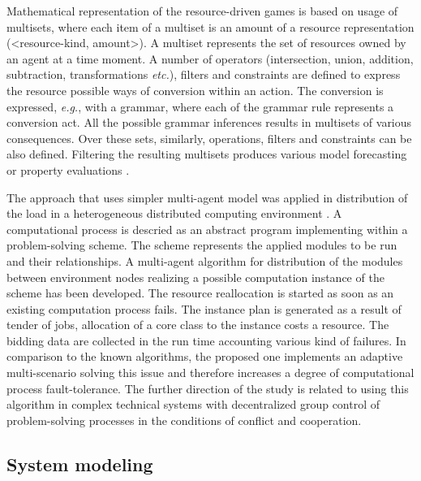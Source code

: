 \documentclass[conference]{IEEEtran}
\begin{document}
Mathematical representation of the resource-driven games is based on usage of multisets, where each item of a multiset is an amount of a resource representation (<resource-kind, amount>). A multiset represents the set of resources owned by an agent at a time moment. A number of operators (intersection, union, addition, subtraction, transformations \emph{etc.}), filters and constraints are defined to express the resource possible ways of conversion within an action. The conversion is expressed, \emph{e.g.}, with a grammar, where each of the grammar rule represents a conversion act. All the possible grammar inferences results in multisets of various consequences. Over these sets, similarly, operations, filters and constraints can be also defined. Filtering the resulting multisets produces various model forecasting or property evaluations \cite{rbg}.

The approach that uses simpler multi-agent model was applied in distribution of the load in a heterogeneous distributed computing environment \cite{b1}. A computational process is descried as an abstract program implementing within a problem-solving scheme. The scheme represents the applied modules to be run and their relationships. A multi-agent algorithm for distribution of the modules between environment nodes realizing a possible computation instance of the scheme has been developed. The resource reallocation is started as soon as an existing computation process fails. The instance plan is generated as a result of tender of jobs, allocation of a core class to the instance costs a resource. The bidding data are collected in the run time accounting various kind of failures. In comparison to the known algorithms, the proposed one implements an adaptive multi-scenario solving this issue and therefore increases a degree of computational process fault-tolerance. The further direction of the study is related to using this algorithm in complex technical systems with decentralized group control of problem-solving processes in the conditions of conflict and cooperation.


\subsection{System modeling}
\label{sec:sys-mdl}
\end{document}
